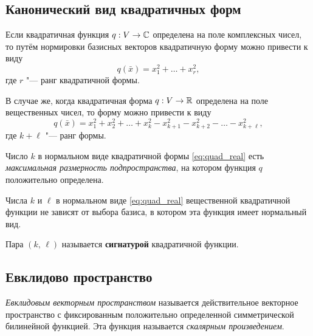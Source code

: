 \subsection*{Канонический вид квадратичных форм}

Если квадратичная функция $q: V \to \mathbb{C}$ определена на поле комплексных чисел, то путём нормировки базисных векторов квадратичную форму можно привести к виду 
$$q(\bar{x}) = x_1^2 + \ldots + x_r^2,$$ где $r$ "--- ранг квадратичной формы.

В случае же, когда квадратичная форма $q: V \to \mathbb{R}$ определена на поле вещественных чисел, то форму можно привести к виду 
\begin{equation}
  \label{eq:quad_real}
  q(\bar{x}) = x_1^2 + x_2^2 + \ldots + x_k^2 - x_{k + 1}^2 - x_{k + 2}^2 - \ldots - x_{k + \ell}^2,
\end{equation}
где $k + \ell$ "--- ранг формы.

Число $k$ в нормальном виде квадратичной формы \ref{eq:quad_real} есть \textit{максимальная размерность подпространства}, на котором функция $q$ положительно определена.

\begin{theorem}
  Числа $k$ и $\ell$ в нормальном виде \ref{eq:quad_real} вещественной квадратичной функции не зависят от выбора базиса, в котором эта функция имеет нормальный вид.

  Пара $(k, \, \ell)$ называется \textbf{сигнатурой} квадратичной функции.
\end{theorem}

\subsection*{Евклидово пространство}

\begin{definition}
  \textit{Евклидовым векторным пространством} называется действительное векторное пространство с фиксированным положительно определенной симметрической билинейной функцией. Эта функция называется \textit{скалярным произведением}.
\end{definition}


